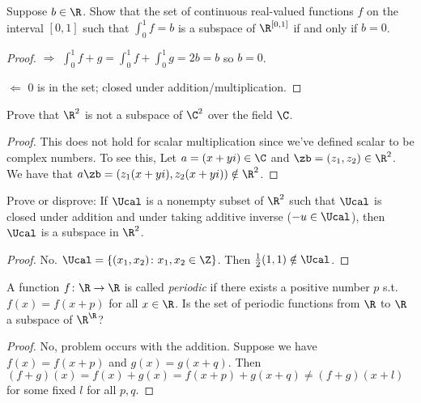 \documentclass{extarticle}
\begin{document}
\begin{problem}{4}
    Suppose \(b \in \R\). Show that the set of continuous real-valued functions \(f\)
    on the interval \([0, 1]\) such that \(\int_0^1 f = b\) is a subspace of \(\R^{[0,1]}\)
    if and only if \(b = 0\). 
\end{problem}

\begin{proof}
\(\Rightarrow\) \(\int_0^1 f + g = \int_0^1 f + \int_0^1 g = 2b = b\) so \(b =0\). 

\(\Leftarrow\) 0 is in the set; closed under addition/multiplication.
\end{proof}

\begin{problem}{5}
    Prove that \(\R^2\) is not a subspace of \(\C^2\) over the field \(\C\). 
\end{problem}

\begin{proof}

This does not hold for scalar multiplication since we've defined scalar to be complex 
numbers. To see this, Let \(a = (x + yi) \in \C\) and \(\zb = (z_1, z_2) \in \R^2\). We 
have that \(a\zb = (z_1(x+yi), z_2 (x+yi)) \notin \R^2\). 

\end{proof}

\begin{problem}{7}
    Prove or disprove: If \(\Ucal\) is a nonempty subset of \(\R^2\) such that \(\Ucal\) is closed 
    under addition and under taking additive inverse (\(-u \in \Ucal\)), then 
    \(\Ucal\) is a subspace in \(\R^2\).
\end{problem}

\begin{proof}
No. \(\Ucal = \{(x_1, x_2) \colon x_1, x_2 \in \Z\}\). Then \(\frac{1}{2}(1, 1) \notin \Ucal\).
\end{proof}

\begin{problem}{9}
    A function \(f\colon \R \to \R\) is called \emph{periodic} if there exists a 
    positive number \(p\) s.t. \(f(x) = f(x + p)\) for all \(x \in \R\). Is the 
    set of periodic functions from \(\R\) to \(\R\) a subspace of \(\R^\R\)?
\end{problem}

\begin{proof}
No, problem occurs with the addition. Suppose we have \(f(x) = f(x + p)\) and 
\(g(x) = g(x + q)\). Then \((f + g)(x) = f(x) + g(x) = f(x + p) + g(x + q) \neq 
(f + g)(x + l)\) for some fixed \(l\) for all \(p,q\). 
\end{proof}
\end{document}
